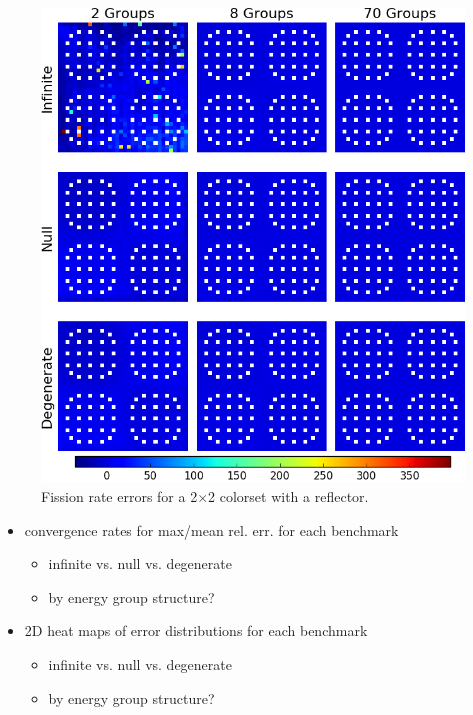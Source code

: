 \begin{figure}[h!]
\centering
\includegraphics[width=\linewidth]{figures/quantification/reflector/fiss-err}
\caption[Fission rate errors for a 2$\times$2 colorset with a reflector]{Fission rate errors for a 2$\times$2 colorset with a reflector.}
\label{fig:chap8-reflector-fiss-err}
\end{figure}

\begin{itemize}[noitemsep]
  \item convergence rates for max/mean rel. err. for each benchmark
  \begin{itemize}[noitemsep]
    \item infinite vs. null vs. degenerate
    \item by energy group structure?
  \end{itemize}
  \item 2D heat maps of error distributions for each benchmark
  \begin{itemize}[noitemsep]
    \item infinite vs. null vs. degenerate
    \item by energy group structure?
  \end{itemize}
\end{itemize}

